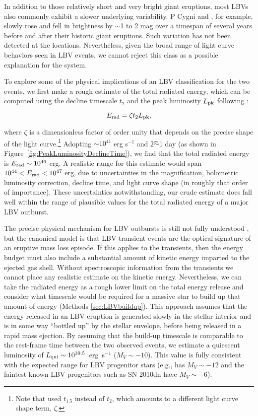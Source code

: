 In addition to those relatively short and very bright giant eruptions,
most LBVs also commonly exhibit a slower underlying variability. P
Cygni and \etaCar, for example, slowly rose and fell in brightness by
$\sim$1 to 2 mag over a timespan of several years before and after
their historic giant eruptions.  Such variation has not been detected
at the \spock locations. Nevertheless, given the broad
range of light curve behaviors seen in LBV events, we cannot reject
this class as a possible explanation for the \spock system.

To explore some of the physical implications of an LBV
classification for the two \spock events, we first make a rough
estimate of the total radiated energy, which can be computed using the
decline timescale $t_2$ and the peak luminosity $L_{\rm pk}$ following
\citet{Smith:2011b}:

\begin{equation}
  \label{eqn:Erad}
  E_{\rm rad} = \zeta \t2 \Lpk,
\end{equation}

\noindent where $\zeta$ is a dimensionless factor of order unity that depends on the
precise shape of the light curve.\footnote{Note that
  \citet{Smith:2011b} used $t_{1.5}$ instead of $t_2$, which amounts
  to a different light curve shape term, $\zeta$.}  Adopting
\Lpk$\sim10^{41}$ erg s$^{-1}$ and \t2$\sim$1 day (as shown in
Figure~\ref{fig:PeakLuminosityDeclineTime}), we find that the total
radiated energy is $E_{\rm rad}\sim10^{46}$ erg.  A realistic range
for this estimate would span $10^{44}<E_{\rm rad}<10^{47}$ erg, due to
uncertainties in the magnification, bolometric luminosity correction,
decline time, and light curve shape (in roughly that order of
importance). These uncertainties notwithstanding, our crude estimate
does fall well within the range of plausible values for the total
radiated energy of a major LBV outburst.

The precise physical mechanism for LBV outbursts is still not fully
understood \citep[e.g.][]{Smith:2006,Woosley:2007,Dessart:2010}, but
the canonical model is that LBV transient events are the optical
signature of an eruptive mass loss episode.  If this applies to the
\spock transients, then the energy budget must also include a
substantial amount of kinetic energy imparted to the ejected gas
shell. Without spectroscopic information from the \spock transients we
cannot place any realistic estimate on the kinetic
energy. Nevertheless, we can take the radiated energy as a rough lower
limit on the total energy release and consider what timescale would be
required for a massive star to build up that amount of energy (Methods
\ref{sec:LBVbuildup}). This approach assumes that the energy released
in an LBV eruption is generated slowly in the stellar interior and is
in some way ``bottled up'' by the stellar envelope, before being
released in a rapid mass ejection.  By assuming that the build-up
timescale is comparable to the rest-frame time between the two
observed events, we estimate a quiescent luminosity of
$L_{\rm qui}\sim10^{39.5}$~erg~s$^{-1}$ ($M_V\sim-10$).  This value is fully
consistent with the expected range for LBV progenitor stars (e.g.,
\etacar has $M_V\sim-12$ and the faintest known LBV progenitors such
as SN 2010dn have $M_V\sim-6$).



